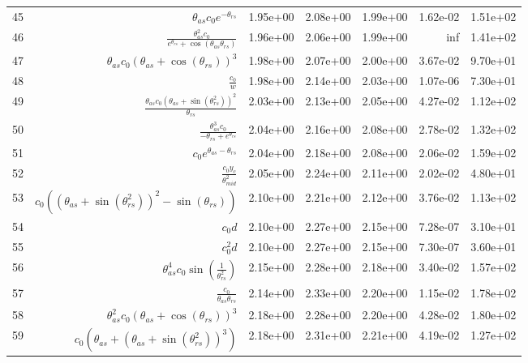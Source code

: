 \begin{tabularx}{\textwidth}{lRRRRRl}
45  &  $ \theta_{as} c_{0} e^{- \theta_{rs}} $  &  1.95e+00  &  2.08e+00  &  1.99e+00  &  1.62e-02  &  1.51e+02  \\ 
46  &  $ \displaystyle\frac{\theta_{as}^{2} c_{0}}{e^{\theta_{rs}} + \cos{\left(\theta_{as} \theta_{rs} \right)}} $  &  1.96e+00  &  2.06e+00  &  1.99e+00  &  inf  &  1.41e+02  \\ 
47  &  $ \theta_{as} c_{0} \left(\theta_{as} + \cos{\left(\theta_{rs} \right)}\right)^{3} $  &  1.98e+00  &  2.07e+00  &  2.00e+00  &  3.67e-02  &  9.70e+01  \\ 
48  &  $ \displaystyle\frac{c_{0}}{w} $  &  1.98e+00  &  2.14e+00  &  2.03e+00  &  1.07e-06  &  7.30e+01  \\ 
49  &  $ \displaystyle\frac{\theta_{as} c_{0} \left(\theta_{as} + \sin{\left(\theta_{rs}^{2} \right)}\right)^{2}}{\theta_{rs}} $  &  2.03e+00  &  2.13e+00  &  2.05e+00  &  4.27e-02  &  1.12e+02  \\ 
50  &  $ \displaystyle\frac{\theta_{as}^{3} c_{0}}{- \theta_{rs} + e^{\theta_{rs}}} $  &  2.04e+00  &  2.16e+00  &  2.08e+00  &  2.78e-02  &  1.32e+02  \\ 
51  &  $ c_{0} e^{\theta_{as} - \theta_{rs}} $  &  2.04e+00  &  2.18e+00  &  2.08e+00  &  2.06e-02  &  1.59e+02  \\ 
52  &  $ \displaystyle\frac{c_{0} y_c}{\theta_{mid}^{2}} $  &  2.05e+00  &  2.24e+00  &  2.11e+00  &  2.02e-02  &  4.80e+01  \\ 
53  &  $ c_{0} \left(\left(\theta_{as} + \sin{\left(\theta_{rs}^{2} \right)}\right)^{2} - \sin{\left(\theta_{rs} \right)}\right) $  &  2.10e+00  &  2.21e+00  &  2.12e+00  &  3.76e-02  &  1.13e+02  \\ 
54  &  $ c_{0} d $  &  2.10e+00  &  2.27e+00  &  2.15e+00  &  7.28e-07  &  3.10e+01  \\ 
55  &  $ c_{0}^{2} d $  &  2.10e+00  &  2.27e+00  &  2.15e+00  &  7.30e-07  &  3.60e+01  \\ 
56  &  $ \theta_{as}^{4} c_{0} \sin{\left(\displaystyle\frac{1}{\theta_{rs}^{2}} \right)} $  &  2.15e+00  &  2.28e+00  &  2.18e+00  &  3.40e-02  &  1.57e+02  \\ 
57  &  $ \displaystyle\frac{c_{0}}{\theta_{as} \theta_{rs}} $  &  2.14e+00  &  2.33e+00  &  2.20e+00  &  1.15e-02  &  1.78e+02  \\ 
58  &  $ \theta_{as}^{2} c_{0} \left(\theta_{as} + \cos{\left(\theta_{rs} \right)}\right)^{3} $  &  2.18e+00  &  2.28e+00  &  2.20e+00  &  4.28e-02  &  1.80e+02  \\ 
59  &  $ c_{0} \left(\theta_{as} + \left(\theta_{as} + \sin{\left(\theta_{rs}^{2} \right)}\right)^{3}\right) $  &  2.18e+00  &  2.31e+00  &  2.21e+00  &  4.19e-02  &  1.27e+02  \\ 

\end{tabularx}
